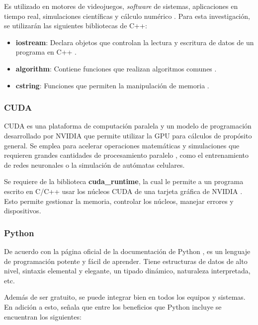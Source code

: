 Es utilizado en motores de videojuegos, \textit{software} de sistemas, aplicaciones en tiempo real, simulaciones científicas y cálculo numérico \cite{msmk2025_c}. Para esta investigación, se utilizarán las siguientes bibliotecas de C++:

\begin{itemize}
	\item \textbf{iostream}: Declara objetos que controlan la lectura y escritura de datos de un programa en C++ \cite{microsoft2025_iostream}.
	
	\item \textbf{algorithm}: Contiene funciones que realizan algoritmos comunes \cite{microsoft2025_algorithm}.
	
	\item \textbf{cstring}: Funciones que permiten la manipulación de memoria \cite{microsoft2024_cstring}.
\end{itemize}

\subsubsection{CUDA}

CUDA es una plataforma de computación paralela y un modelo de programación desarrollado por NVIDIA que permite utilizar la GPU para cálculos de propósito general. Se emplea para acelerar operaciones matemáticas y simulaciones que requieren grandes cantidades de procesamiento paralelo \cite{cuda}, como el entrenamiento de redes neuronales o la simulación de autómatas celulares.

Se requiere de la biblioteca \textbf{cuda\_runtime}, la cual le permite a un programa escrito en C/C++ usar los núcleos CUDA de una tarjeta gráfica de NVIDIA \cite{cuda_runtime}. Esto permite gestionar la memoria, controlar los núcleos, manejar errores y dispositivos.

\subsubsection{Python}

De acuerdo con la página oficial de la documentación de Python \cite{pythonTutorial}, es un lenguaje de programación potente y fácil de aprender. Tiene estructuras de datos de alto nivel, sintaxis elemental y elegante, un tipado dinámico, naturaleza interpretada, etc. 

Además de ser gratuito, se puede integrar bien en todos los equipos y sistemas. En adición a esto, \cite{awsPython} señala que entre los beneficios que Python incluye se encuentran los siguientes:

